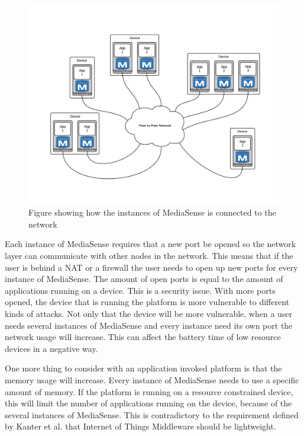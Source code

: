 \begin{figure}[t]
	\centering
    	\includegraphics[scale=0.25]{part_2/mediasense/several_nodes_on_one_device.png}
		\caption{Figure showing how the instances of MediaSense is connected to the network} 
\end{figure}

Each instance of MediaSense requires that a new port be opened so the network layer can communicate with other nodes in the network. This means that if the user is behind a NAT or a firewall the user needs to open up new ports for every instance of MediaSense. The amount of open ports is equal to the amount of applications running on a device. This is a security issue. With more ports opened, the device that is running the platform is more vulnerable to different kinds of attacks. Not only that the device will be more vulnerable, when a user needs several instances of MediaSense and every instance need its own port the network usage will increase. This can affect the battery time of low resource devices in a negative way.

One more thing to consider with an application invoked platform is that the memory usage will increase. Every instance of MediaSense needs to use a specific amount of memory. If the platform is running on a resource constrained device, this will limit the number of applications running on the device, because of the several instances of MediaSense. This is contradictory to the requirement defined by Kanter et al. \cite{Kanter539187} that Internet of Things Middleware should be lightweight.

